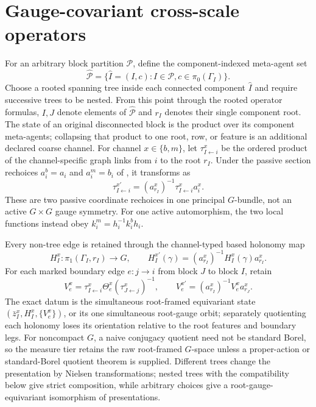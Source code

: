 \section{Gauge-covariant cross-scale operators}
\label{sec:rg-gauge-cross-scale}

For an arbitrary block partition $\mathcal P$, define the component-indexed
meta-agent set
\begin{equation}
\widehat{\mathcal P}
=\{\widehat I=(I,c):I\in\mathcal P,
c\in\pi_0(\Gamma_I)\}.
\label{eq:rg-component-meta-index}
\end{equation}
Choose a rooted spanning tree inside each connected component $\widehat I$ and
require successive trees to be nested.  From this point through the rooted
operator formulas, $I,J$ denote elements of $\widehat{\mathcal P}$ and
$r_I$ denotes their single component root.  The state of an original
disconnected block is the product over its component meta-agents; collapsing
that product to one root, row, or feature is an additional declared coarse
channel.  For channel $x\in\{b,m\}$, let
$\tau^x_{I\leftarrow i}$ be the ordered product of the channel-specific graph
links from $i$ to the root $r_I$.  Under the passive section rechoices
$a_i^b=a_i$ and $a_i^m=b_i$ of , it transforms as
\begin{equation}
\tau^{x\prime}_{I\leftarrow i}
=(a^x_{r_I})^{-1}\tau^x_{I\leftarrow i}a_i^x.
\label{eq:rg-tree-transport-law}
\end{equation}
These are two passive coordinate rechoices in one principal $G$-bundle, not
an active $G\times G$ gauge symmetry.  For one active automorphism, the two
local functions instead obey $k_i^m=h_i^{-1}k_i^bh_i$.

Every non-tree edge is retained through the channel-typed based holonomy map
\begin{equation}
H_I^x:\pi_1(\Gamma_I,r_I)\longrightarrow G,
\qquad
H_I^{x\prime}(\gamma)
=(a^x_{r_I})^{-1}H_I^x(\gamma)a^x_{r_I}.
\label{eq:rg-full-holonomy-representation}
\end{equation}
For each marked boundary edge $e:j\to i$ from block $J$ to block $I$, retain
\begin{equation}
V_e^x=\tau^x_{I\leftarrow i}\Theta_e^x
(\tau^x_{J\leftarrow j})^{-1},
\qquad
V_e^{x\prime}=(a^x_{r_I})^{-1}V_e^xa^x_{r_J}.
\label{eq:rg-dressed-boundary-edge}
\end{equation}
The exact datum is the simultaneous root-framed equivariant state
$(\bar z_I^x,H_I^x,\{V_e^x\})$, or its one simultaneous root-gauge orbit;
separately quotienting each holonomy loses its orientation relative to the root
features and boundary legs.  For noncompact $G$, a naive conjugacy quotient
need not be standard Borel, so the measure tier retains the raw root-framed
$G$-space unless a proper-action or standard-Borel quotient theorem is
supplied.  Different trees change the presentation by Nielsen transformations;
nested trees with the compatibility below give strict composition, while
arbitrary choices give a root-gauge-equivariant isomorphism of presentations.

